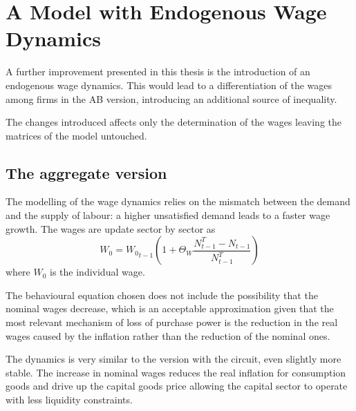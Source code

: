 \chapter{A Model with Endogenous Wage Dynamics}
\label{ch:wages}
A further improvement presented in this thesis is the introduction of an endogenous wage dynamics.
This would lead to a differentiation of the wages among firms in the AB version, introducing an additional source of inequality.

The changes introduced affects only the determination of the wages leaving the matrices of the model untouched.

\section{The aggregate version}

The modelling of the wage dynamics relies on the mismatch between the demand and the supply of labour: a higher unsatisfied demand leads to a faster wage growth.
The wages are update sector by sector as $$W_0 =  {W_0}_{t-1} (1 + \Theta_W \frac{N^T_{t-1} - N_{t-1}}{N^T_{t-1}})$$ where $W_0$ is the individual wage.

The behavioural equation chosen does not include the possibility that the nominal wages decrease, which is an acceptable approximation given that the most relevant mechanism of loss of purchase power is the reduction in the real wages caused by the inflation rather than the reduction of the nominal ones.

The dynamics is very similar to the version with the circuit, even slightly more stable.
The increase in nominal wages reduces the real inflation for consumption goods and drive up the capital goods price allowing the capital sector to operate with less liquidity constraints.

